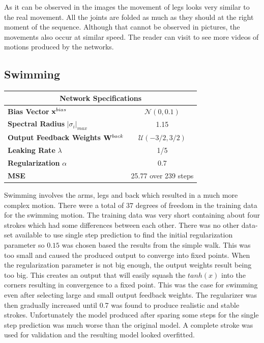 \documentclass[letterpaper,9pt]{article}
\newcommand{\networkSpecs}[6]{
  \begin{center}
  \begin{tabular}{ | l | c | }
    \hline
    \multicolumn{2}{|c|}{{\bf Network Specifications}} \\
    \hline
    {\bf Bias Vector} ${\bf x}^{bias}$ & $\mathcal{N}(#1)$ \\
    \hline
    {\bf Spectral Radius} $|\sigma_i|_{max}$ & #2 \\
    \hline
    {\bf Output Feedback Weights} ${\bf W}^{back}$ & $\mathcal{U}(#3)$ \\
    \hline
    {\bf Leaking Rate} $\lambda$ & #4 \\
    \hline
    {\bf Regularization} $\alpha$ & #5\\
    \hline
    {\bf MSE} & #6\\
    \hline
  \end{tabular}    
  \end{center}
}
\begin{document}
As it can be observed in the images the movement of legs looks very similar to the real movement. All the joints are folded as much as they should at the right moment of the sequence. Although that cannot be observed in pictures, the movements also occur at similar speed. The reader can visit \cite{LambdaNN} to see more videos of motions produced by the networks.

\subsection{Swimming}

\networkSpecs{0,0.1}
             {1.15}
             {-3/2,3/2}
             {1/5}
             {0.7}
             {25.77 over 239 steps}


Swimming involves the arms, legs and back which resulted in a much more complex motion. There were a total of $37$ degrees of freedom in the training data for the swimming motion. The training data was very short containing about four strokes which had some differences between each other. There was no other data-set available to use single step prediction to find the initial regularization parameter so $0.15$ was chosen based the results from the simple walk. This was too small and caused the produced output to converge into fixed points. When the regularization parameter is not big enough, the output weights result being too big. This creates an output that will easily squash the $tanh(x)$ into the corners resulting in convergence to a fixed point. This was the case for swimming even after selecting large and small output feedback weights. The regularizer was then gradually increased until 0.7 was found to produce realistic and stable strokes. Unfortunately the model produced after sparing some steps for the single step prediction was much worse than the original model. A complete stroke was used for validation and the resulting model looked overfitted.
\end{document}
